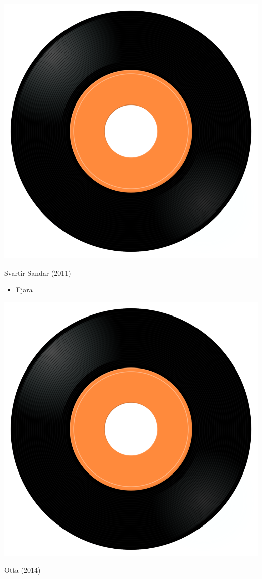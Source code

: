 \begin{minipage}[t]{0.25\textwidth}
\captionsetup{type=figure}
\includegraphics[width=\textwidth]{Images/cover.png}
\caption*{Svartir Sandar (2011)}
\end{minipage}
\begin{minipage}[t]{0.25\textwidth}\vspace{0pt}
\begin{itemize}[nosep,leftmargin=1em,labelwidth=*,align=left]
	\setlength{\itemsep}{0pt}
	\item Fjara
\end{itemize}
\end{minipage}
\begin{minipage}[t]{0.25\textwidth}
\captionsetup{type=figure}
\includegraphics[width=\textwidth]{Images/cover.png}
\caption*{Otta (2014)}
\end{minipage}
